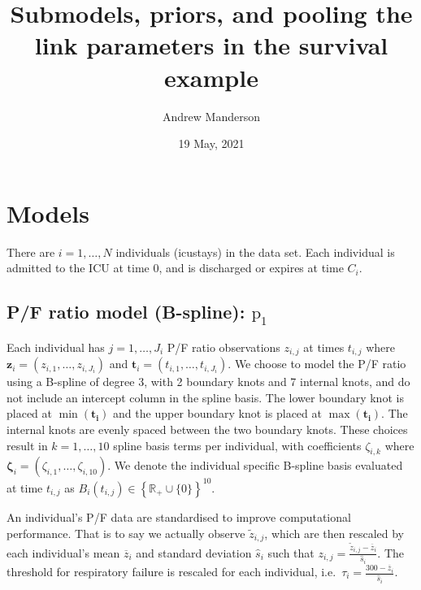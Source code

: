 \documentclass[
  10pt,
  a4paper,
]{article}
\title{Submodels, priors, and pooling the link parameters in the
survival example}
\author{Andrew Manderson}
\date{19 May, 2021}
\newcommand{\pd}{\text{p}}
\begin{document}
\maketitle

\hypertarget{models}{%
\section{Models}\label{models}}

There are \(i = 1, \ldots, N\) individuals (icustays) in the data set.
Each individual is admitted to the ICU at time \(0\), and is discharged
or expires at time \(C_{i}\).

\hypertarget{pf-ratio-model-b-spline-pd_1}{%
\subsection{\texorpdfstring{P/F ratio model (B-spline):
\(\pd_{1}\)}{P/F ratio model (B-spline): \textbackslash pd\_\{1\}}}\label{pf-ratio-model-b-spline-pd_1}}

Each individual has \(j = 1, \ldots, J_{i}\) P/F ratio observations
\(z_{i, j}\) at times \(t_{i, j}\) where
\(\boldsymbol{z}_{i} = (z_{i, 1}, \ldots, z_{i, J_{i}})\) and
\(\boldsymbol{t}_{i} = (t_{i, 1}, \ldots, t_{i, J_{i}})\). We choose to
model the P/F ratio using a B-spline of degree 3, with 2 boundary knots
and 7 internal knots, and do not include an intercept column in the
spline basis. The lower boundary knot is placed at
\(\min(\boldsymbol{t_{i}})\) and the upper boundary knot is placed at
\(\max(\boldsymbol{t_{i}})\). The internal knots are evenly spaced
between the two boundary knots. These choices result in
\(k = 1, \ldots, 10\) spline basis terms per individual, with
coefficients \(\zeta_{i, k}\) where
\(\boldsymbol{\zeta}_{i} = (\zeta_{i, 1}, \ldots, \zeta_{i, 10})\). We
denote the individual specific B-spline basis evaluated at time
\(t_{i, j}\) as
\(B_{i}(t_{i, j}) \in \left\{\mathbb{R}_{+} \cup \{0\}\right\}^{10}\).

An individual's P/F data are standardised to improve computational
performance. That is to say we actually observe \(\tilde{z}_{i, j}\),
which are then rescaled by each individual's mean \(\overline{z}_{i}\)
and standard deviation \(\hat{s}_{i}\) such that
\(z_{i, j} = \frac{\tilde{z}_{i, j} - \overline{z}_{i}}{\hat{s}_{i}}\).
The threshold for respiratory failure is rescaled for each individual,
i.e.~\(\tau_{i} = \frac{300 - \overline{z}_{i}}{\hat{s}_{i}}\).
\end{document}
